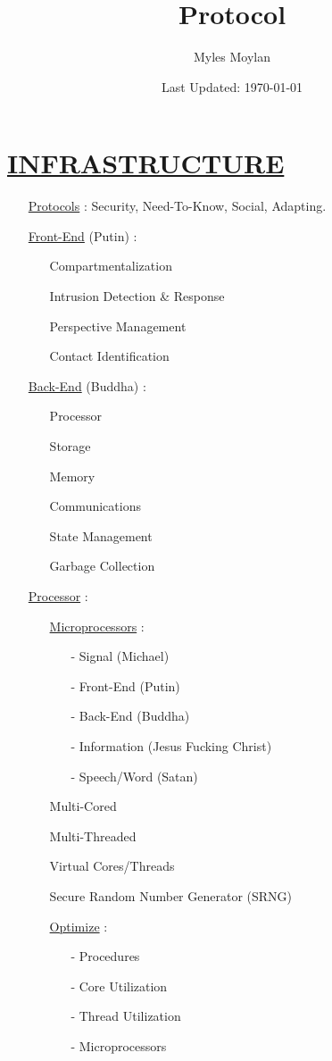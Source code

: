 \documentclass[11pt]{article}
\title{	
	\normalfont \normalsize 
	\huge Protocol
}
\author{Myles Moylan}
\date{Last Updated: \normalsize\today}
\begin{document}
\maketitle
\section*{\ul{INFRASTRUCTURE}}
\begin{enumerate}
	\item[] \ul{Protocols} : Security, Need-To-Know, Social, Adapting.
	
	\item[] \ul{Front-End} (Putin) :
	\begin{enumerate}
		\item[] Compartmentalization
		\item[] Intrusion Detection \& Response
		\item[] Perspective Management
		\item[] Contact Identification
	\end{enumerate}

	\item[] \ul{Back-End} (Buddha) :
	\begin{enumerate}
		\item[] Processor
		\item[] Storage
		\item[] Memory
		\item[] Communications
		\item[] State Management
		\item[] Garbage Collection
	\end{enumerate}

	\item[] \ul{Processor} :
	\begin{enumerate}
		\item[] \ul{Microprocessors} :
		\begin{enumerate}
			\item[-] Signal (Michael)
			\item[-] Front-End (Putin)
			\item[-] Back-End (Buddha)
			\item[-] Information (Jesus Fucking Christ)
			\item[-] Speech/Word (Satan)
		\end{enumerate}
	
		\item[] Multi-Cored
		\item[] Multi-Threaded
		\item[] Virtual Cores/Threads
		\item[] Secure Random Number Generator (SRNG)
		\item[] \ul{Optimize}  :
		\begin{enumerate}
			\item[-] Procedures
			\item[-] Core Utilization
			\item[-] Thread Utilization
			\item[-] Microprocessors
		\end{enumerate}
	\end{enumerate}
	

\end{enumerate}
\end{document}
